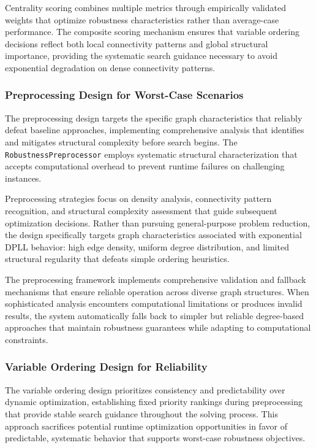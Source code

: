 Centrality scoring combines multiple metrics through empirically validated weights that optimize robustness characteristics rather than average-case performance. The composite scoring mechanism ensures that variable ordering decisions reflect both local connectivity patterns and global structural importance, providing the systematic search guidance necessary to avoid exponential degradation on dense connectivity patterns.

\subsubsection{Preprocessing Design for Worst-Case Scenarios}

The preprocessing design targets the specific graph characteristics that reliably defeat baseline approaches, implementing comprehensive analysis that identifies and mitigates structural complexity before search begins. The \texttt{RobustnessPreprocessor} employs systematic structural characterization that accepts computational overhead to prevent runtime failures on challenging instances.

Preprocessing strategies focus on density analysis, connectivity pattern recognition, and structural complexity assessment that guide subsequent optimization decisions. Rather than pursuing general-purpose problem reduction, the design specifically targets graph characteristics associated with exponential DPLL behavior: high edge density, uniform degree distribution, and limited structural regularity that defeats simple ordering heuristics.

The preprocessing framework implements comprehensive validation and fallback mechanisms that ensure reliable operation across diverse graph structures. When sophisticated analysis encounters computational limitations or produces invalid results, the system automatically falls back to simpler but reliable degree-based approaches that maintain robustness guarantees while adapting to computational constraints.

\subsubsection{Variable Ordering Design for Reliability}

The variable ordering design prioritizes consistency and predictability over dynamic optimization, establishing fixed priority rankings during preprocessing that provide stable search guidance throughout the solving process. This approach sacrifices potential runtime optimization opportunities in favor of predictable, systematic behavior that supports worst-case robustness objectives.

